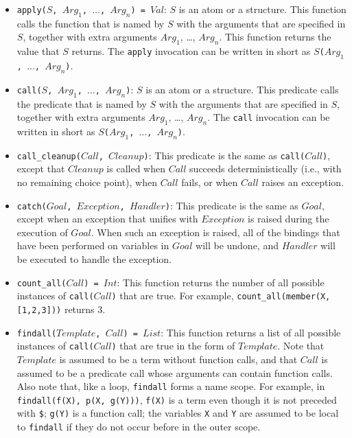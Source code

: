 \begin{itemize}
\item \texttt{apply($S$, $Arg_1$, $\ldots$, $Arg_n$) = $Val$}:   $S$ is an atom or a structure.  This function calls the function that is named by $S$ with the arguments that are specified in $S$, together with extra arguments $Arg_1$, \ldots, $Arg_n$.  This function returns the value that $S$ returns. The \texttt{apply} invocation can be written in short as \texttt{$S$($Arg_1$, $\ldots$, $Arg_n$)}.
\item \texttt{call($S$, $Arg_1$, $\ldots$, $Arg_n$)}:  $S$ is an atom or a structure.  This predicate calls the predicate that is named by $S$ with the arguments that are specified in $S$, together with extra arguments $Arg_1$, \ldots, $Arg_n$. The \texttt{call} invocation can be written in short as \texttt{$S$($Arg_1$, $\ldots$, $Arg_n$)}.
\item \texttt{call\_cleanup($Call$, $Cleanup$)}: This predicate is the same as \texttt{call($Call$)}, except that \texttt{$Cleanup$} is called when \texttt{$Call$} succeeds deterministically (i.e., with no remaining choice point), when \texttt{$Call$} fails, or when \texttt{$Call$} raises an exception.
\item \texttt{catch($Goal$, $Exception$, $Handler$)}: This predicate is the same as $Goal$, except when an exception that unifies with $Exception$ is raised during the execution of $Goal$. When such an exception is raised, all of the bindings that have been performed on variables in \texttt{$Goal$} will be undone, and \texttt{$Handler$} will be executed to handle the exception.
\item \texttt{count\_all($Call$) = $Int$}: This function returns the number of all possible instances of \texttt{call($Call$)} that are true. For example, \texttt{count\_all(member(X, [1,2,3]))} returns 3.
\item \texttt{findall($Template$, $Call$) = $List$}: This function returns a list of all possible instances of \texttt{call($Call$)} that are true in the form of $Template$. Note that $Template$ is assumed to be a term without function calls, and that $Call$ is assumed to be a predicate call whose arguments can contain function calls. Also note that, like a loop, \texttt{findall} forms a name scope. For example, in \texttt{findall(f(X), p(X, g(Y)))}, \texttt{f(X)} is a term even though it is not preceded with \verb+$+; \texttt{g(Y)} is a function call; the variables \texttt{X} and \texttt{Y} are assumed to be local to \texttt{findall} if they do not occur before in the outer scope.

\end{itemize}

